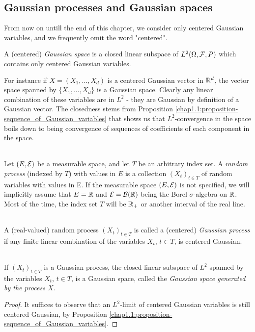 \subsection{Gaussian processes and Gaussian spaces}
From now on untill the end of this chapter, we consider only centered Gaussian variables, and we frequently omit the word "centered".
\begin{definition}\label{chap1.3:definition-gaussian_space}
A (centered) \textit{Gaussian space} is a closed linear subspace of $L^2(\Omega, \mathcal{F}, P)$ which contains only centered Gaussian variables. 
\end{definition}
For instance if $X=(X_1,...,X_d)$ is a centered Gaussian vector in $\mathbb{R}^d$, the vector space spanned by $\{X_1,...,X_d\}$ is a Gaussian space. Clearly any linear combination of these variables are in $L^2$ - they are Gaussian by definition of a Gaussian vector. The closedness stems from Proposition \ref{chap1.1:proposition-sequence_of_Gaussian_variables} that shows us that $L^2$-convergence in the space boils down to being convergence of sequences of coefficients of each component in the space.

\begin{definition} \label{chap1.3:definition-random_process}
 \\
Let $(E, \mathcal{E})$ be a measurable space, and let $T$ be an arbitrary index set. A \textit{random process} (indexed by $T$) with values in $E$ is a collection $(X_t)_{t \in T}$ of random variables with values in E. If the measurable space $(E, \mathcal{E})$ is not specified, we will implicitly assume that $E=\mathbb{R}$ and $\mathcal{E}=\mathcal{B}(\mathbb{R})$ being the Borel $\sigma$-algebra on $\mathbb{R}$. Most of the time, the index set $T$ will be $\mathbb{R}_+$ or another interval of the real line.
\end{definition}

\begin{definition} \label{chap1.3:definition-gaussian_process}
 \\
A (real-valued) random process $(X_t)_{t \in T}$ is called a (centered) \textit{Gaussian process} if any finite linear combination of the variables $X_t$, $t \in T$, is centered Gaussian.
\end{definition}

\begin{proposition} \label{chap1.3:proposition-gaussian_space_generated_by_process}
 \\
If $(X_t)_{t \in T}$ is a Gaussian process, the closed linear subspace of $L^2$ spanned by the variables $X_t$, $t \in T$, is a Gaussian space, called the \textit{Gaussian space generated by the process $X$}.
\end{proposition}
\begin{proof}
It suffices to observe that an $L^2$-limit of centered Gaussian variables is still centered Gaussian, by Proposition \ref{chap1.1:proposition-sequence_of_Gaussian_variables}.
\end{proof}

